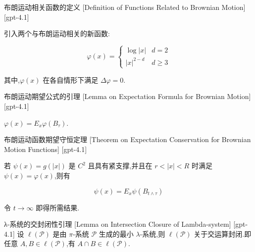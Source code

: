 \documentclass[UTF8]{ctexart}
\begin{document}
    
    
    \begin{dfn}
        {布朗运动相关函数的定义}
        [Definition of Functions Related to Brownian Motion]
        [gpt-4.1]
        
引入两个与布朗运动相关的新函数:

\[
\varphi(x) = 
\begin{cases}
\log |x| & d = 2 \\
|x|^{2-d} & d \geq 3
\end{cases}
\]

其中,$\varphi(x)$ 在各自情形下满足 $\Delta \varphi = 0$.

    \end{dfn}
    
    
    
    \begin{lma}
        {布朗运动期望公式的引理}
        [Lemma on Expectation Formula for Brownian Motion]
        [gpt-4.1]
        
$\varphi(x) = E_{x} \varphi(B_{\tau})$.

    \end{lma}
    
    
    
    \begin{thm}
        {布朗运动函数期望守恒定理}
        [Theorem on Expectation Conservation for Brownian Motion Functions]
        [gpt-4.1]
        
若 $\psi(x) = g(|x|)$ 是 $C^{2}$ 且具有紧支撑,并且在 $r < |x| < R$ 时满足 $\psi(x) = \varphi(x)$,则有

\[
\psi(x) = E_{x} \psi(B_{t \wedge \tau})
\]

令 $t \to \infty$ 即得所需结果.

    \end{thm}
    
    
    
    \begin{lma}
        {λ-系统的交封闭性引理}
        [Lemma on Intersection Closure of Lambda-system]
        [gpt-4.1]
        设 $\ell(\mathcal{P})$ 是由 $\pi$-系统 $\mathcal{P}$ 生成的最小 $\lambda$-系统,则 $\ell(\mathcal{P})$ 关于交运算封闭.即任意 $A, B \in \ell(\mathcal{P})$,有 $A \cap B \in \ell(\mathcal{P})$.
    \end{lma}
    
\end{document}
